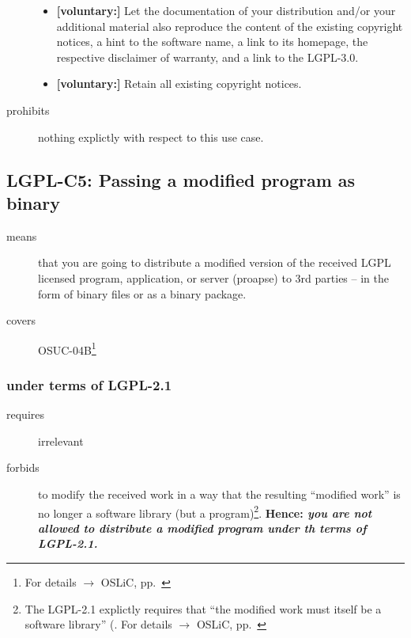 \begin{description}
\begin{itemize}
  \item \textbf{[voluntary:]} Let the documentation of your distribution and/or
  your additional material also reproduce the content of the existing
  copyright notices, a hint to the software name, a link to its homepage,
  the respective disclaimer of warranty, and a link to the LGPL-3.0.
  
  \item \textbf{[voluntary:]} Retain all existing copyright notices. 
  
 \end{itemize}
 
\item[prohibits] nothing explictly with respect to this use case.

\end{description}

\subsection{LGPL-C5: Passing a modified program as binary}
\label{OSUC-04B-LGPL} 

\begin{description}
\item[means] that you are going to distribute a modified version of the received
LGPL licensed pro\-gram, application, or server (proapse) to 3rd parties -- in
the form of binary files or as a binary package.
\item[covers] OSUC-04B\footnote{For details $\rightarrow$ OSLiC, pp.\
\pageref{OSUC-04B-DEF}}
\end{description}

\subsubsection{under terms of LGPL-2.1}

\begin{description}
  \item[requires] irrelevant
  \item[forbids] to modify the received work in a way that the resulting
  \enquote{modified work} is no longer a software library (but a
  program)\footnote{The LGPL-2.1 explictly requires that \enquote{the modified
  work must itself be a software library} (\cite[cf.][\nopage wp.\
  §2a]{Lgpl21OsiLicense1999a}. For details $\rightarrow$ OSLiC, pp.\
  \pageref{para:libislib}}. \textbf{Hence: \emph{you are not allowed to
  distribute a modified program under th terms of LGPL-2.1.}}
\end{description}

